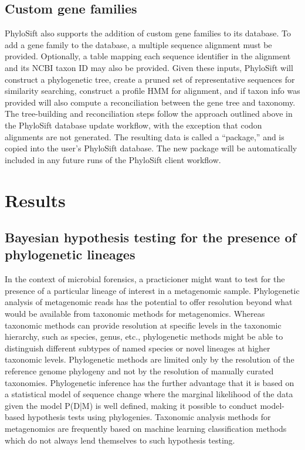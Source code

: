 \documentclass[10pt]{article}
\begin{document}
\subsection*{Custom gene families}

PhyloSift also supports the addition of custom gene families to its database.
To add a gene family to the database, a multiple sequence alignment must be provided.
Optionally, a table mapping each sequence identifier in the alignment and its NCBI taxon ID may also be provided.
Given these inputs, PhyloSift will construct a phylogenetic tree, create a pruned set of representative sequences for similarity searching, construct a profile HMM for alignment, and if taxon info was provided will also compute a reconciliation between the gene tree and taxonomy.
The tree-building and reconciliation steps follow the approach outlined above in the PhyloSift database update workflow, with the exception that codon alignments are not generated.
The resulting data is called a ``package,'' and is copied into the user's PhyloSift database.
The new package will be automatically included in any future runs of the PhyloSift client workflow.



\section*{Results}

\subsection*{Bayesian hypothesis testing for the presence of phylogenetic lineages}
In the context of microbial forensics, a practicioner might want to test for the presence of a particular lineage of interest in a metagenomic sample. 
Phylogenetic analysis of metagenomic reads has the potential to offer resolution beyond what would be available from taxonomic methods for metagenomics.
Whereas taxonomic methods can provide resolution at specific levels in the taxonomic hierarchy, such as species, genus, etc., phylogenetic methods might be able to distinguish different subtypes of named species or novel lineages at higher taxonomic levels.
Phylogenetic methods are limited only by the resolution of the reference genome phylogeny and not by the resolution of manually curated taxonomies. 
Phylogenetic inference has the further advantage that it is based on a statistical model of sequence change where the marginal likelihood of the data given the model P(D|M) is well defined, making it possible to conduct model-based hypothesis tests using phylogenies.
Taxonomic analysis methods for metagenomics are frequently based on machine learning classification methods which do not always lend themselves to such hypothesis testing.
\end{document}
